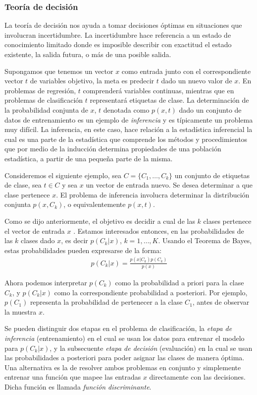 \subsubsection{Teoría de decisión}
	
	La teoría de decisión nos ayuda a tomar decisiones óptimas en situaciones que involucran incertidumbre. La incertidumbre hace referencia a un estado de conocimiento limitado donde es imposible describir con exactitud el estado existente, la salida futura, o más de una posible salida.
	
	Supongamos que tenemos un vector $x$ como entrada junto con el correspondiente vector $t$ de variables objetivo, la meta es predecir $t$ dado un nuevo valor de $x$. En problemas de regresión, $t$ comprenderá variables continuas, mientras que en problemas de clasificación $t$ representará etiquetas de clase. La determinación de la probabilidad conjunta de $x$, $t$ denotada como $p(x,t)$ dado un conjunto de datos de entrenamiento es un ejemplo de \textit{inferencia} y es típicamente un problema muy difícil. La inferencia, en este caso, hace relación a la estadística inferencial la cual es una parte de la estadística que comprende los métodos y procedimientos que por medio de la inducción determina propiedades de una población estadística, a partir de una pequeña parte de la misma.
	
	Consideremos el siguiente ejemplo, sea $C=\{C_1,\dots,C_k\}$ un conjunto de etiquetas de clase, sea $t \in C$ y sea $x$ un vector de entrada nuevo. Se desea determinar a que clase pertenece $x$. El problema de inferencia involucra determinar la distribución conjunta $p(x,C_k)$, o equivalentemente $p(x,t)$.

	Como se dijo anteriormente, el objetivo es decidir a cual de las $k$ clases pertenece el vector de entrada $x$ . Estamos interesados entonces, en las probabilidades de las $k$ clases dado $x$, es decir $p(C_k|x)$, $k=1,\dots,K$. Usando el Teorema de Bayes, estas probabilidades pueden expresarse de la forma:
		\begin{align*}
			p(C_k|x) = \frac{p(x|C_k)p(C_k)}{p(x)}
		\end{align*}

	Ahora podemos interpretar $p(C_k)$ como la probabilidad a priori para la clase $C_k$, y $p(C_k|x)$ como la correspondiente probabilidad a posteriori. Por ejemplo, $p(C_1)$ representa la probabilidad de pertenecer a la clase $C_1$, antes de observar la muestra $x$.
	
	Se pueden distinguir dos etapas en el problema de clasificación, la \textit{etapa de inferencia} (entrenamiento) en el cual se usan los datos para entrenar el modelo para $p(C_k|x)$, y la subsecuente \textit{etapa de decisión} (evaluación) en la cual se usan las probabilidades a posteriori para poder asignar las clases de manera óptima. Una alternativa es la de resolver ambos problemas en conjunto y simplemente entrenar una función que mapee las entradas $x$ directamente con las decisiones. Dicha función es llamada \textit{función discriminante}.
	
